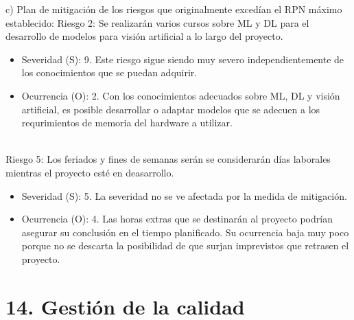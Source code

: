 \documentclass[
11pt, %
]{plan}
\begin{document}
c) Plan de mitigación de los riesgos que originalmente excedían el RPN máximo establecido:
Riesgo 2: Se realizarán varios cursos sobre ML y DL para el desarrollo de modelos para visión artificial a lo largo del proyecto.
\begin{itemize}
	\item Severidad (S): 9. Este riesgo sigue siendo muy severo independientemente de los conocimientos que se puedan adquirir.
	\item Ocurrencia (O): 2. Con los conocimientos adecuados sobre ML, DL y visión artificial, es posible desarrollar o adaptar modelos que se adecuen a los requrimientos de memoria del hardware a utilizar. \\ \\
\end{itemize}
Riesgo 5: Los feriados y fines de semanas serán se considerarán días laborales mientras el proyecto esté en deasarrollo.
\begin{itemize}
	\item Severidad (S): 5. La severidad no se ve afectada por la medida de mitigación.
	\item Ocurrencia (O): 4. Las horas extras que se destinarán al proyecto podrían asegurar su conclusión en el tiempo planificado. Su ocurrencia baja muy poco porque no se descarta la posibilidad de que surjan imprevistos que retrasen el proyecto.
\end{itemize}

\section{14. Gestión de la calidad}
\label{sec:calidad}
\end{document}
